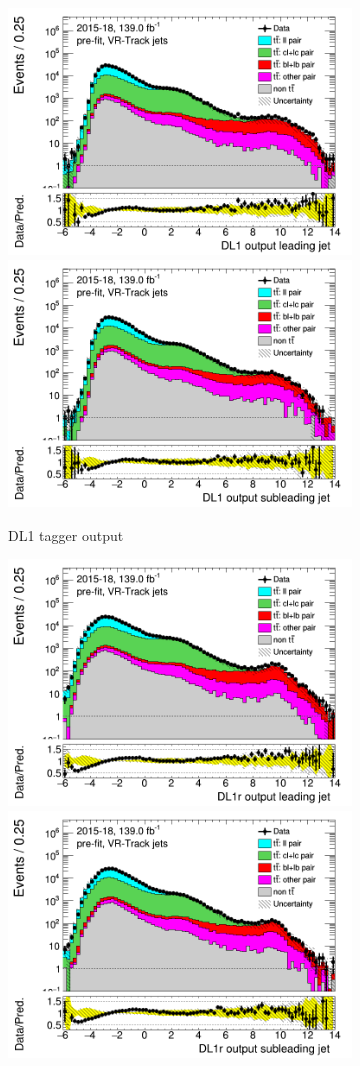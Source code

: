 \documentclass[letterpaper,12pt]{article}
\begin{document}
\begin{figure}[H]
	\begin{subfigure}[t]{1\linewidth}
	\includegraphics[width=.45\textwidth]{FTAG_plots/pretagNoRwwithhighpTVRJetsall/DataMC_h_J0_DL1trackjet_log.png}
	\includegraphics[width=.45\textwidth]{FTAG_plots/pretagNoRwwithhighpTVRJetsall/DataMC_h_J1_DL1trackjet_log.png}\\
	\caption{DL1 tagger output}
	\end{subfigure}
	\begin{subfigure}[t]{1\linewidth}
	\includegraphics[width=.45\textwidth]{FTAG_plots/pretagNoRwwithhighpTVRJetsall/DataMC_h_J0_DL1rtrackjet_log.png}
	\includegraphics[width=.45\textwidth]{FTAG_plots/pretagNoRwwithhighpTVRJetsall/DataMC_h_J1_DL1rtrackjet_log.png}\\

\end{subfigure}
\end{figure}
\end{document}
